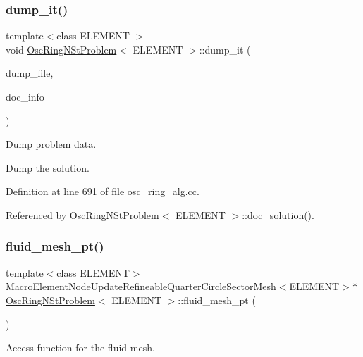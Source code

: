 \subsubsection{\texorpdfstring{dump\+\_\+it()}{dump\_it()}\hspace{0.1cm}{\footnotesize\ttfamily [2/2]}}
{\footnotesize\ttfamily template$<$class E\+L\+E\+M\+E\+NT $>$ \\
void \hyperlink{classOscRingNStProblem}{Osc\+Ring\+N\+St\+Problem}$<$ E\+L\+E\+M\+E\+NT $>$\+::dump\+\_\+it (\begin{DoxyParamCaption}\item[{ofstream \&}]{dump\+\_\+file,  }\item[{Doc\+Info}]{doc\+\_\+info }\end{DoxyParamCaption})}



Dump problem data. 

Dump the solution. 

Definition at line 691 of file osc\+\_\+ring\+\_\+alg.\+cc.



Referenced by Osc\+Ring\+N\+St\+Problem$<$ E\+L\+E\+M\+E\+N\+T $>$\+::doc\+\_\+solution().

\mbox{\label{classOscRingNStProblem_a9c0a167a315009ff298b4c43967aba9a}} 
\subsubsection{\texorpdfstring{fluid\+\_\+mesh\+\_\+pt()}{fluid\_mesh\_pt()}\hspace{0.1cm}{\footnotesize\ttfamily [1/2]}}
{\footnotesize\ttfamily template$<$class E\+L\+E\+M\+E\+NT$>$ \\
Macro\+Element\+Node\+Update\+Refineable\+Quarter\+Circle\+Sector\+Mesh$<$E\+L\+E\+M\+E\+NT$>$$\ast$ \hyperlink{classOscRingNStProblem}{Osc\+Ring\+N\+St\+Problem}$<$ E\+L\+E\+M\+E\+NT $>$\+::fluid\+\_\+mesh\+\_\+pt (\begin{DoxyParamCaption}{ }\end{DoxyParamCaption})\hspace{0.3cm}{\ttfamily [inline]}}



Access function for the fluid mesh. 



